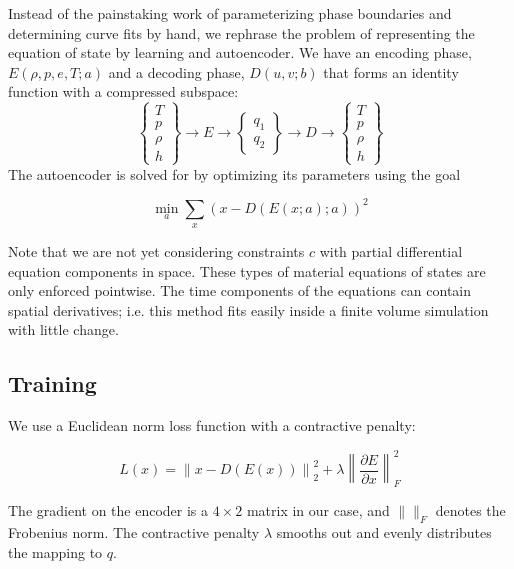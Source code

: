 \documentclass[]{article}
\begin{document}
Instead of the painstaking work of parameterizing phase boundaries and
determining curve fits by hand, we rephrase the problem of representing
the equation of state by learning and autoencoder. We have an encoding
phase, \(E(\rho,p,e,T; a)\) and a decoding phase, \(D(u,v; b)\) that
forms an identity function with a compressed subspace:
\begin{equation}
\left\{ \begin{array}{c}
T\\ p\\ \rho\\ h
\end{array}\right\} \rightarrow  E \rightarrow 
\left\{ \begin{array}{c} q_1\\q_2 \end{array} \right\}\rightarrow D \rightarrow 
\left\{ \begin{array}{c}
T\\ p\\ \rho\\ h
\end{array}\right\}
\end{equation}
The autoencoder is solved for by optimizing its parameters using the
goal

\begin{equation}
\min_a \sum_x \left( x - D(E(x;a);a) \right)^2
\end{equation}

Note that we are not yet considering constraints \(c\) with partial
differential equation components in space. These types of material
equations of states are only enforced pointwise. The time components of
the equations can contain spatial derivatives; i.e. this method fits
easily inside a finite volume simulation with little change.

\hypertarget{header-n3305}{%
\subsection{Training}\label{header-n3305}}

We use a Euclidean norm loss function with a contractive penalty:

\[L(x)=\left\|x-D(E(x))\right\|^2_2+\lambda\left\|\frac{\partial E}{\partial x}\right\|_F^2\]

The gradient on the encoder is a \(4\times2\) matrix in our case, and
\(\|\|_F\) denotes the Frobenius norm. The contractive penalty
\(\lambda\) smooths out and evenly distributes the mapping to \(q\).
\end{document}
